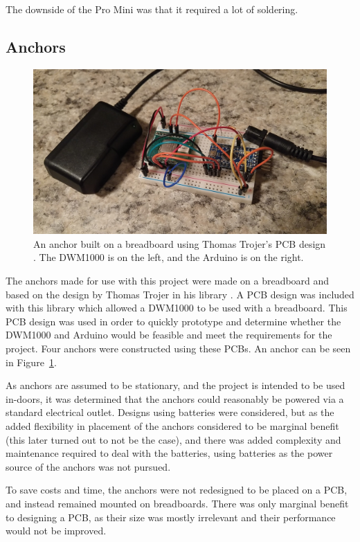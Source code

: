 The downside of the Pro Mini was that it required a lot of soldering. 

\subsection{Anchors}
\begin{figure}
	\centering
	\includegraphics[width=\linewidth]{Figures/Anchor.jpg}
	\decoRule
	\caption{An anchor built on a breadboard using Thomas Trojer's PCB design \cite{ThotroGithub}. The DWM1000 is on the left, and the Arduino is on the right.}
	\label{fig:Anchor}
\end{figure}

The anchors made for use with this project were made on a breadboard and based on the design by Thomas Trojer in his  library \cite{ThotroGithub}. A PCB design was included with this library which allowed a DWM1000 to be used with a breadboard. This PCB design was used in order to quickly prototype and determine whether the DWM1000 and Arduino would be feasible and meet the requirements for the project. Four anchors were constructed using these PCBs. An anchor can be seen in Figure~\ref{fig:Anchor}.

As anchors are assumed to be stationary, and the project is intended to be used in-doors, it was determined that the anchors could reasonably be powered via a standard electrical outlet. Designs using batteries were considered, but as the added flexibility in placement of the anchors considered to be marginal benefit (this later turned out to not be the case), and there was added complexity and maintenance required to deal with the batteries, using batteries as the power source of the anchors was not pursued.

To save costs and time, the anchors were not redesigned to be placed on a PCB, and instead remained mounted on breadboards. There was only marginal benefit to designing a PCB, as their size was mostly irrelevant and their performance would not be improved.

